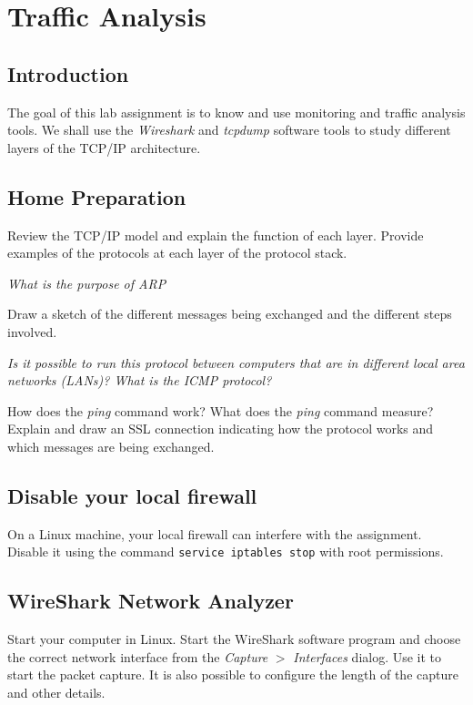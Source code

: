 \chapter{Traffic Analysis}

\section{Introduction}

The goal of this lab assignment is to know and use monitoring and traffic analysis tools. We shall use the \emph{Wireshark} and \emph{tcpdump} software tools to study different layers of the TCP/IP architecture.

\section{Home Preparation}

Review the TCP/IP model and explain the function of each layer. Provide examples of the protocols at each layer of the protocol stack.

\emph{What is the purpose of ARP \cite{rfc826}}

Draw a sketch of the different messages being exchanged and the different steps involved.

\emph{Is it possible to run this protocol between computers that are in different local area networks (LANs)? What is the ICMP protocol?}

How does the \emph{ping} command work?
What does the \emph{ping} command measure?
Explain and draw an SSL connection indicating how the protocol works and which messages are being exchanged.

\section{Disable your local firewall}

On a Linux machine, your local firewall can interfere with the assignment.
Disable it using the command \texttt{service iptables stop} with root permissions.

\section{WireShark Network Analyzer}

Start your computer in Linux. Start the WireShark software program and choose the correct network interface from the \emph{Capture} $>$ \emph{Interfaces} dialog. Use it to start the packet capture. It is also possible to configure the length of the capture and other details.

